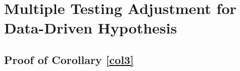 \documentclass[11pt]{article}
\newcommand{\PP}{\mathbb{P}}
\begin{document}
	
	
	\section{Multiple Testing Adjustment for Data-Driven Hypothesis}
	
	
	
	
	
	\subsection{Proof of Corollary \ref{col3}}
	
\end{document}
